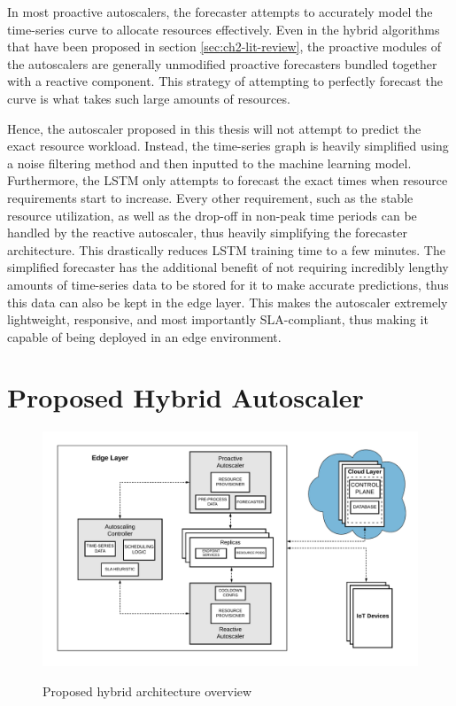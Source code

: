 In most proactive autoscalers, the forecaster attempts to accurately model the time-series curve to allocate resources effectively. Even in the hybrid algorithms that have been proposed in section \ref{sec:ch2-lit-review}, the proactive modules of the autoscalers are generally unmodified proactive forecasters bundled together with a reactive component. This strategy of attempting to perfectly forecast the curve is what takes such large amounts of resources.\par

Hence, the autoscaler proposed in this thesis will not attempt to predict the exact resource workload. Instead, the time-series graph is heavily simplified using a noise filtering method and then inputted to the machine learning model. Furthermore, the LSTM only attempts to forecast the exact times when resource requirements start to increase. Every other requirement, such as the stable resource utilization, as well as the drop-off in non-peak time periods can be handled by the reactive autoscaler, thus heavily simplifying the forecaster architecture. This drastically reduces LSTM training time to a few minutes. The simplified forecaster has the additional benefit of not requiring incredibly lengthy amounts of time-series data to be stored for it to make accurate predictions, thus this data can also be kept in the edge layer. This makes the autoscaler extremely lightweight, responsive, and most importantly SLA-compliant, thus making it capable of being deployed in an edge environment.\par

\section{Proposed Hybrid Autoscaler}
\label{sec:ch3-hybrid-autoscale-overview} 

\begin{figure}[htb]
    \centering
    \caption{Proposed hybrid architecture overview}
    \includegraphics[width=1.0\linewidth]{Figures/Hybrid-Architecture-Overview.pdf}
    \label{fig:hybrid-arch-overview}
\end{figure}

